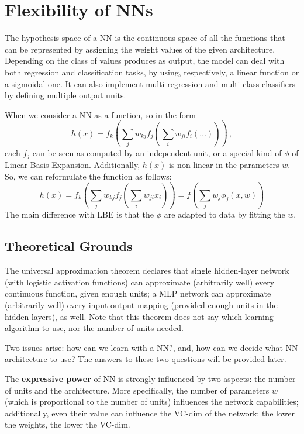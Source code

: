 \section{Flexibility of NNs}

The hypothesis space of a NN is the continuous space of all the functions that can be represented by assigning the weight values of the given architecture. Depending on the class of values produces as output, the model can deal with both regression and classification tasks, by using, respectively, a linear function or a sigmoidal one. It can also implement multi-regression and multi-class classifiers by defining multiple output units.

When we consider a NN as a function, so in the form
\begin{equation*}
    h(x) = f_k(\sum_j w_{kj} f_j (\sum_i w_{ji} f_i(\dots))) \, ,
\end{equation*}
each $f_j$ can be seen as computed by an independent unit, or a special kind of $\phi$ of Linear Basis Expansion. Additionally, $h(x)$ is non-linear in the parameters $w$. So, we can reformulate the function as follows:
\begin{equation*}
    h(x) = f_k(\sum_j w_{kj} f_j (\sum_i w_{ji} x_i)) = f(\sum_j w_j \phi_j(x,w))
\end{equation*}
The main difference with LBE is that the $\phi$ are adapted to data by fitting the $w$.

\subsection{Theoretical Grounds}

The universal approximation theorem declares that single hidden-layer network (with logistic activation functions) can approximate (arbitrarily well) every continuous function, given enough units; a MLP network can approximate (arbitrarily well) every input-output mapping (provided enough units in the hidden layers), as well. Note that this theorem does not say which learning algorithm to use, nor the number of units needed.

Two issues arise: how can we learn with a NN?, and, how can we decide what NN architecture to use? The answers to these two questions will be provided later.

The \textbf{expressive power} of NN is strongly influenced by two aspects: the number of units and the architecture. More specifically, the number of parameters $w$ (which is proportional to the number of units) influences the network capabilities; additionally, even their value can influence the VC-dim of the network: the lower the weights, the lower the VC-dim.

